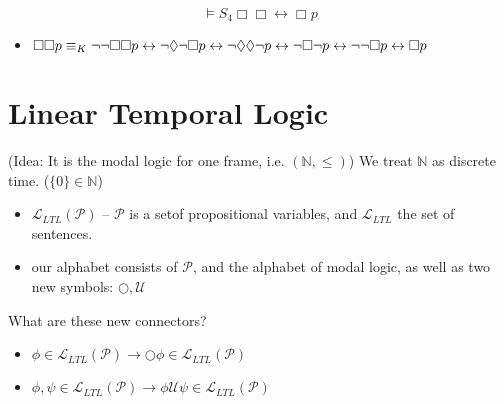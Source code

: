 {\begin{myproof}
    \end{myproof}

        \begin{equation}
             \vDash S_4 \Box \Box \leftrightarrow \Box p      
        \end{equation}

    \begin{myproof}
        \begin{itemize}
                \item $ \Box \Box p \equiv_K \neg \neg \Box \Box p \leftrightarrow \neg \Diamond \neg \Box p \leftrightarrow \neg \Diamond \Diamond \neg p \leftrightarrow \\
\neg \Box \neg p \leftrightarrow \neg \neg \Box p \leftrightarrow \Box p      
                    $
                
        \end{itemize}
    \end{myproof}



}


\section{Linear Temporal Logic}
    (Idea: It is the modal logic for one frame, i.e. $(\mathbb{N},\leq)$)
    We treat $\mathbb{N}$ as discrete time. ($\{0\} \in \mathbb{N}$)

    {
        \begin{itemize}
            \item $\mathcal{L}_{LTL}(\mathcal{P})$ -- $\mathcal{P}$ is a setof propositional variables, and $\mathcal{L}_{LTL}$ the set of sentences.
           \item our alphabet consists of $\mathcal{P}$, and the alphabet of modal logic, as well as two new symbols: $\bigcirc, \mathcal{U}$
                
        \end{itemize}

        What are these new connectors?
        \begin{itemize}
            \item $\phi \in \mathcal{L}_{LTL}(\mathcal{P}) \rightarrow \bigcirc \phi \in \mathcal{L}_{LTL}(\mathcal{P})$ 
            \item $\phi, \psi \in \mathcal{L}_{LTL}(\mathcal{P}) \rightarrow \phi \mathcal{U} \psi \in \mathcal{L}_{LTL}(\mathcal{P})$
                
        \end{itemize}


    }

